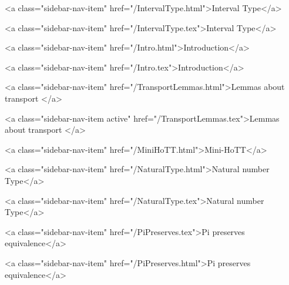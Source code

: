           <a class="sidebar-nav-item" href="/IntervalType.html">Interval Type</a>
        
      
    
      
        
          <a class="sidebar-nav-item" href="/IntervalType.tex">Interval Type</a>
        
      
    
      
        
          <a class="sidebar-nav-item" href="/Intro.html">Introduction</a>
        
      
    
      
        
          <a class="sidebar-nav-item" href="/Intro.tex">Introduction</a>
        
      
    
      
        
          <a class="sidebar-nav-item" href="/TransportLemmas.html">Lemmas about transport </a>
        
      
    
      
        
          <a class="sidebar-nav-item active" href="/TransportLemmas.tex">Lemmas about transport </a>
        
      
    
      
        
          <a class="sidebar-nav-item" href="/MiniHoTT.html">Mini-HoTT</a>
        
      
    
      
        
          <a class="sidebar-nav-item" href="/NaturalType.html">Natural number Type</a>
        
      
    
      
        
          <a class="sidebar-nav-item" href="/NaturalType.tex">Natural number Type</a>
        
      
    
      
        
          <a class="sidebar-nav-item" href="/PiPreserves.tex">Pi preserves equivalence</a>
        
      
    
      
        
          <a class="sidebar-nav-item" href="/PiPreserves.html">Pi preserves equivalence</a>
        
      
    
